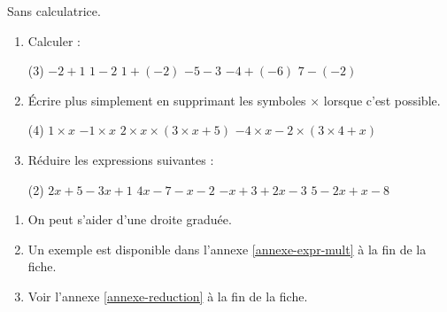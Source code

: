 \documentclass[10pt,a4paper]{article}
\begin{document}
\begin{bloc}
\begin{exo}
Sans calculatrice.
\begin{enumerate}[leftmargin=*]
    \item Calculer :
    \begin{tasks}(3)
        \task \(-2+1\)
        \task \(1-2\)
        \task \(1+(-2)\)
        \task \(-5-3\)
        \task \(-4+(-6)\)
        \task \(7-(-2)\)
    \end{tasks}
    \item Écrire plus simplement en supprimant les symboles \og \(\times\) \fg{} lorsque c'est possible.
    \begin{tasks}(4)
        \task \(1\times x\)
        \task \(-1\times x\)
        \task \(2\times x \times (3\times x+5)\)
        \task \(-4\times x-2\times(3\times 4+x) \)
    \end{tasks}
    \item Réduire les expressions suivantes :
    \begin{tasks}(2)
        \task \(2x+5-3x+1\)
        \task \(4x-7-x-2\)
        \task \(-x+3+2x-3\)
        \task \(5-2x+x-8\)
    \end{tasks}
\end{enumerate}
\end{exo}

\begin{indication}
    \begin{enumerate}
        \item On peut s'aider d'une droite graduée.
        \item Un exemple est disponible dans l'annexe \ref{annexe-expr-mult} à la fin de la fiche.
        \item Voir l'annexe \ref{annexe-reduction} à la fin de la fiche.
    \end{enumerate}
\end{indication}
\end{bloc}
\end{document}
